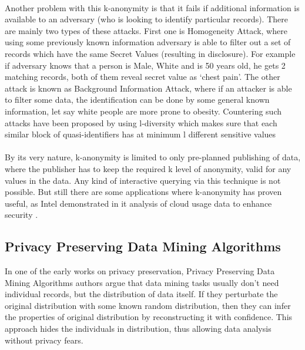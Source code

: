 \documentclass{report}
\begin{document}
\paragraph{}
Another problem with this k-anonymity is that it fails if additional information is available to an adversary (who is looking to identify particular records). There are mainly two types of these attacks. First one is Homogeneity Attack, where using some previously known information adversary is able to filter out a set of records which have the same Secret Values (resulting in disclosure). For example if adversary knows that a person is Male, White and is 50 years old, he gets 2 matching records, both of them reveal secret value as `chest pain'. The other attack is known as Background Information Attack, where if an attacker is able to filter some data, the identification can be done by some general known information, let say white people are more prone to obesity. Countering such attacks have been proposed by using l-diversity \cite{machanavajjhala2006diversity} which makes sure that each similar block of quasi-identifiers has at minimum l different sensitive values

\paragraph{}
By its very nature, k-anonymity is limited to only pre-planned publishing of data, where the publisher has to keep the required k level of anonymity, valid for any values in the data. Any kind of interactive querying via this technique is not possible. But still there are some applications where k-anonymity has proven useful, as Intel demonstrated in it analysis of cloud usage data to enhance security \cite{sedayao2012enhancing}. 




\subsection{Privacy Preserving Data Mining Algorithms}
In one of the early works on privacy preservation, Privacy Preserving Data Mining Algorithms \cite{agrawal2001design} authors argue that data mining tasks usually don’t need individual records, but the distribution of data itself. If they perturbate the original distribution with some known random distribution, then they can infer the properties of original distribution by reconstructing it with confidence. This approach hides the individuals in distribution, thus allowing data analysis without privacy fears.
\end{document}
